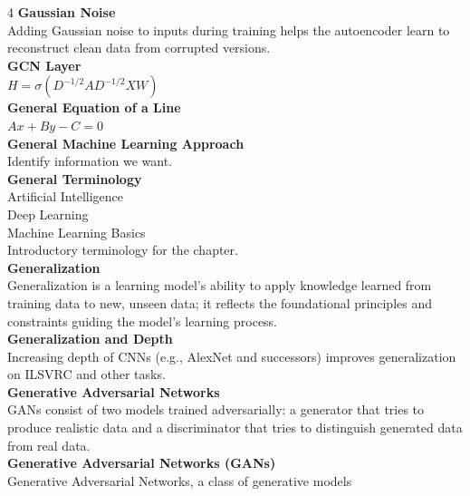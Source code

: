 \documentclass[8pt]{extarticle}
\begin{document}
\begin{multicols}{4}
\vspace{2pt}\textbf{Gaussian Noise}\\
Adding Gaussian noise to inputs during training helps the autoencoder learn to reconstruct clean data from corrupted versions.\\
\vspace{2pt}\textbf{GCN Layer}\\
$H = \sigma(D^{-1/2} A D^{-1/2} X W)$\\
\vspace{2pt}\textbf{General Equation of a Line}\\
$A x + B y - C = 0$\\
\vspace{2pt}\textbf{General Machine Learning Approach}\\
Identify information we want.\\
\vspace{2pt}\textbf{General Terminology}\\
Artificial Intelligence\\
Deep Learning\\
Machine Learning Basics\\
Introductory terminology for the chapter.\\
\vspace{2pt}\textbf{Generalization}\\
Generalization is a learning model's ability to apply knowledge learned from training data to new, unseen data; it reflects the foundational principles and constraints guiding the model's learning process.\\
\vspace{2pt}\textbf{Generalization and Depth}\\
Increasing depth of CNNs (e.g., AlexNet and successors) improves generalization on ILSVRC and other tasks.\\
\vspace{2pt}\textbf{Generative Adversarial Networks}\\
GANs consist of two models trained adversarially: a generator that tries to produce realistic data and a discriminator that tries to distinguish generated data from real data.\\
\vspace{2pt}\textbf{Generative Adversarial Networks (GANs)}\\
Generative Adversarial Networks, a class of generative models\\


\end{multicols}
\end{document}
